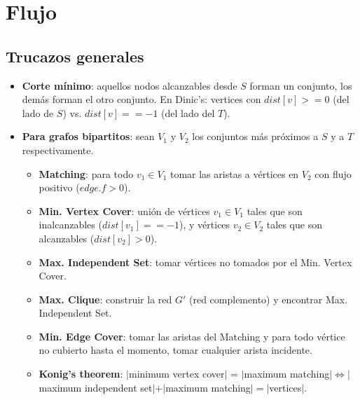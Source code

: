 {\section{Flujo}%
\subsection{Trucazos generales}
\begin{itemize}
\item \textbf{Corte mínimo}: aquellos nodos alcanzables desde $S$ forman un conjunto, los demás forman el otro conjunto.
En Dinic's: vertices con $dist[v] >= 0$ (del lado de $S$) vs.  $dist[v] == -1$ (del lado del $T$).
\item \textbf{Para grafos bipartitos}: sean $V_1$ y $V_2$ los conjuntos más próximos a $S$ y a $T$ respectivamente.
	\begin{itemize}
	\item \textbf{Matching}: para todo $v_1 \in V_1$ tomar las aristas a vértices en $V_2$ con flujo positivo ($edge.f > 0$).
	\item \textbf{Min. Vertex Cover}: unión de vértices $v_1 \in V_1$ tales que son inalcanzables ($dist[v_1] == -1$),
	y vértices $v_2 \in V_2$ tales que son alcanzables ($dist[v_2] > 0$).
	\item \textbf{Max. Independent Set}: tomar vértices no tomados por el Min. Vertex Cover.
	\item \textbf{Max. Clique}: construir la red $G'$ (red complemento) y encontrar Max. Independent Set.
	\item \textbf{Min. Edge Cover}: tomar las aristas del Matching y para todo vértice no cubierto hasta el momento, 
	tomar cualquier arista incidente.
    \item \textbf{Konig's theorem}: $|$minimum vertex cover$|$ = $|$maximum matching$| \Leftrightarrow |$maximum independent set$| + |$maximum matching$| = |$vertices$|$.\\
	\end{itemize}
\end{itemize}

%

}
